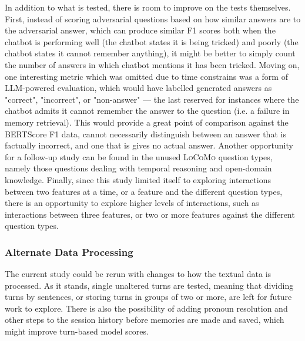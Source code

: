 In addition to what is tested, there is room to improve on the tests themselves. First, instead of scoring adversarial questions based on how similar answers are to the adversarial answer, which can produce similar F1 scores both when the chatbot is performing well (the chatbot states it is being tricked) and poorly (the chatbot states it cannot remember anything), it might be better to simply count the number of answers in which chatbot mentions it has been tricked. Moving on, one interesting metric which was omitted due to time constrains was a form of LLM-powered evaluation, which would have labelled generated answers as "correct", "incorrect", or "non-answer" — the last reserved for instances where the chatbot admits it cannot remember the answer to the question (i.e. a failure in memory retrieval). This would provide a great point of comparison against the BERTScore F1 data, cannot necessarily distinguish between an answer that is factually incorrect, and one that is gives no actual answer. Another opportunity for a follow-up study can be found in the unused \textsc{LoCoMo} question types, namely those questions dealing with temporal reasoning and open-domain knowledge. Finally, since this study limited itself to exploring interactions between two features at a time, or a feature and the different question types, there is an opportunity to explore higher levels of interactions, such as interactions between three features, or two or more features against the different question types.
	
	
\subsubsection{Alternate Data Processing}

The current study could be rerun with changes to how the textual data is processed. As it stands, single unaltered turns are tested, meaning that dividing turns by sentences, or storing turns in groups of two or more, are left for future work to explore. There is also the possibility of adding pronoun resolution and other steps to the session history before memories are made and saved, which might improve turn-based model scores.

















